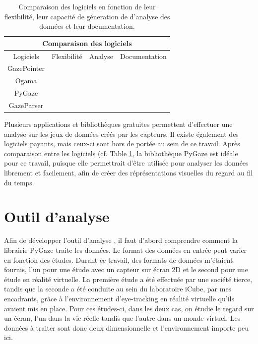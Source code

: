 \documentclass[hidelinks,12pt]{article}
\newcommand{\cmark}{\ding{51}}
\newcommand{\xmark}{\ding{55}}
\begin{document}
\bigskip
\begin{table}[htpb]
  \begin{center}
    \begin{tabular}{|c||c|c|c|}
      \hline
      \multicolumn{4}{|c|}{Comparaison des logiciels}             \\
      \hline
      Logiciels   & Flexibilité   & Analyse       & Documentation \\
      \hline
      GazePointer & \xmark        & \cmark        & \cmark        \\
      Ogama       & \xmark        & \cmark \cmark & \cmark        \\
      PyGaze      & \cmark \cmark & \cmark \cmark & \cmark \cmark \\
      GazeParser  & \cmark        & \cmark \cmark & \cmark        \\
      \hline
    \end{tabular}
    \caption{Comparaison des logiciels en fonction de leur flexibilité, leur
      capacité de géneration de d'analyse des données et leur documentation.}
    \label{tab:comparaison}
  \end{center}
\end{table}

Plusieurs applications et bibliothèques gratuites permettent d'effectuer une
analyse sur les jeux de données créés par les capteurs. Il existe également des
logiciels payants, mais ceux-ci sont hors de portée au sein de ce
travail. Après comparaison entre les logiciels (cf. Table \ref{tab:comparaison},
la bibliothèque PyGaze est idéale pour ce travail, puisque elle permettrait
d'être utilisée pour analyser les données librement et facilement, afin de
créer des réprésentations visuelles du regard au fil du temps.


\section{Outil d'analyse}

Afin de développer l'outil d'analyse \cite{github_ter}, il faut d'abord
comprendre comment la librairie PyGaze traite les données. Le format des
données en entrée peut varier en fonction des études. Durant ce travail, des
formats de données m'étaient fournis, l'un pour une étude avec un capteur sur
écran 2D et le second pour une étude en réalité virtuelle. La première étude a
été effectuée par une société tierce, tandis que la seconde a été conduite au
sein du laboratoire iCube, par mes encadrants, grâce à l'environnement
d'eye-tracking en réalité virtuelle qu'ils avaient mis en place. Pour ces
études-ci, dans les deux cas, on étudie le regard sur un écran, l'un dans la vie
réelle tandis que l'autre dans un monde virtuel. Les données à traiter sont
donc deux dimensionnelle et l'environnement importe peu ici.
\end{document}
